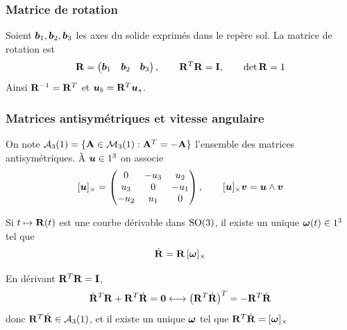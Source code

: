 \subsubsection{Matrice de rotation}

\begin{definition}
    Soient $\bm{b}_1,\bm{b}_2,\bm{b}_3$ les axes du solide
    exprimés dans le repère sol. La matrice de rotation est
    \[
        \mathbf{R} = \begin{pmatrix}
            \bm{b}_1 & \bm{b}_2 & \bm{b}_3
        \end{pmatrix},
        \qquad
        \mathbf{R}^T\mathbf{R} = \mathbf{I},
        \qquad \det\mathbf{R} = 1
    \]
    Ainsi $\mathbf{R}^{-1} = \mathbf{R}^T$ et $\bm{u}_b
    = \mathbf{R}^T\bm{u}_s$.
\end{definition}

\subsubsection{Matrices antisymétriques et vitesse angulaire}

On note $\mathcal{A}_3(1) = \{\mathbf{A}\in\mathcal{M}_3(1) :
\mathbf{A}^T = -\mathbf{A}\}$ l'ensemble des matrices antisymétriques. À
$\bm{u}\in1^3$ on associe
\[
    [\bm{u}]_{\times} = \begin{pmatrix}
        0 & -u_3 & u_2\\
        u_3 & 0 & -u_1\\
        -u_2 & u_1 & 0
    \end{pmatrix},
    \qquad
    [\bm{u}]_{\times}\bm{v} = \bm{u}\wedge\bm{v}
\]

\begin{proposition}
    Si $t\mapsto\mathbf{R}(t)$ est une courbe dérivable dans $\mathrm{SO}(3)$, il
    existe un unique $\bm{\omega}(t)\in1^3$ tel que
    \[
        \dot{\mathbf{R}} = \mathbf{R}\,[\bm{\omega}]_{\times}
    \]
\end{proposition}

\begin{demonstration}
    En dérivant $\mathbf{R}^T\mathbf{R} = \mathbf{I}$,
    \[
        \dot{\mathbf{R}}^T\mathbf{R} + \mathbf{R}^T\dot{\mathbf{R}} = \mathbf{0}
        \longleftrightarrow
        \bigl(\mathbf{R}^T\dot{\mathbf{R}}\bigr)^T
        = -\mathbf{R}^T\dot{\mathbf{R}}
    \]
    donc $\mathbf{R}^T\dot{\mathbf{R}}\in\mathcal{A}_3(1)$, et il existe un
    unique $\bm{\omega}$ tel que $\mathbf{R}^T\dot{\mathbf{R}}
    = [\bm{\omega}]_{\times}$
\end{demonstration}


